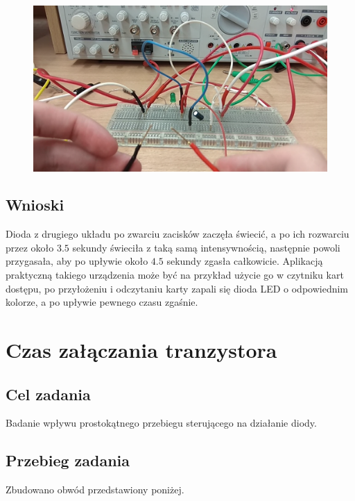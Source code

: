 \documentclass[polish,polish,a4paper]{article}
\begin{document}
\begin{figure}[H]
	\centering
	\includegraphics[scale=0.3]{4.png}
\end{figure}

\subsection{Wnioski}

Dioda z drugiego układu po zwarciu zacisków zaczęła świecić, a po ich rozwarciu przez około $ 3.5 $ sekundy świeciła z taką samą intensywnością, następnie powoli przygasała, aby po upływie około $ 4.5 $ sekundy zgasła całkowicie. Aplikacją praktyczną takiego urządzenia może być na przykład użycie go w czytniku kart dostępu, po przyłożeniu i odczytaniu karty zapali się dioda LED o odpowiednim kolorze, a po upływie pewnego czasu zgaśnie. 

\section{Czas załączania tranzystora}

\subsection{Cel zadania}
Badanie wpływu prostokątnego przebiegu sterującego na działanie diody.
\subsection{Przebieg zadania}

Zbudowano obwód przedstawiony poniżej.
\end{document}

